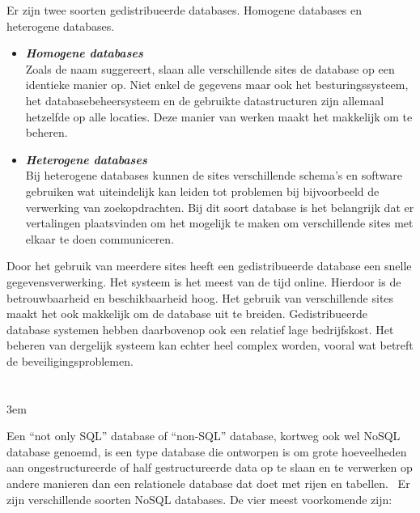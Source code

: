 Er zijn twee soorten gedistribueerde databases. Homogene databases en heterogene databases.


\begin{itemize}
      \item \textbf{\textit{Homogene databases}} \\
            Zoals de naam suggereert, slaan alle verschillende sites de database op een identieke manier op. Niet enkel de gegevens maar ook het besturingssysteem, het databasebeheersysteem en de gebruikte datastructuren zijn allemaal hetzelfde op alle locaties. Deze manier van werken maakt het makkelijk om te beheren.

      \item \textbf{\textit{Heterogene databases}} \\
            Bij heterogene databases kunnen de sites verschillende schema’s en software gebruiken wat uiteindelijk kan leiden tot problemen bij bijvoorbeeld de verwerking van zoekopdrachten. Bij dit soort database is het belangrijk dat er vertalingen plaatsvinden om het mogelijk te maken om verschillende sites met elkaar te doen communiceren.
\end{itemize}

Door het gebruik van meerdere sites heeft een gedistribueerde database een snelle gegevensverwerking. Het systeem is het meest van de tijd online. Hierdoor is de betrouwbaarheid en beschikbaarheid hoog. Het gebruik van verschillende sites maakt het ook makkelijk om de database uit te breiden. Gedistribueerde database systemen hebben daarbovenop ook een relatief lage bedrijfskost. Het beheren van dergelijk systeem kan echter heel complex worden, vooral wat betreft de beveiligingsproblemen.

\section{}%
\emergencystretch 3em
\label{sec:NoSQL-databases}

Een “not only SQL” database of “non-SQL” database, kortweg ook wel NoSQL database genoemd, is een type database die ontworpen is om grote hoeveelheden aan ongestructureerde of half gestructureerde data op te slaan en te verwerken op andere manieren dan een relationele database dat doet met rijen en tabellen.~\autocite{DistributedDatabase2022} Er zijn verschillende soorten NoSQL databases. De vier meest voorkomende zijn:

